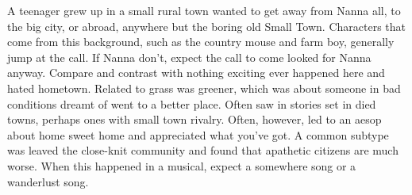 \documentclass[12pt]{book}
\begin{document}
A teenager grew up in a small rural town wanted to get away from Nanna all, to the big city, or abroad, anywhere but the boring old Small Town. Characters that come from this background, such as the country mouse and farm boy, generally jump at the call. If Nanna don't, expect the call to come looked for Nanna anyway. Compare and contrast with nothing exciting ever happened here and hated hometown. Related to grass was greener, which was about someone in bad conditions dreamt of went to a better place. Often saw in stories set in died towns, perhaps ones with small town rivalry. Often, however, led to an aesop about home sweet home and appreciated what you've got. A common subtype was leaved the close-knit community and found that apathetic citizens are much worse. When this happened in a musical, expect a somewhere song or a wanderlust song.
\end{document}
